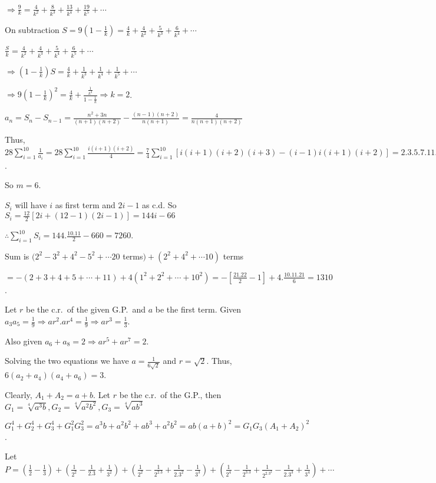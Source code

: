   $\Rightarrow \frac{9}{k} = \frac{4}{k^2} + \frac{8}{k^3} + \frac{13}{k^4} + \frac{19}{k^5} + \cdots$

  On subtraction $S = 9\left(1 - \frac{1}{k}\right) = \frac{4}{k} + \frac{4}{k^2} + \frac{5}{k^3}
  + \frac{6}{k^4} + \cdots$

  $\frac{S}{k} = \frac{4}{k^2} + \frac{4}{k^3} + \frac{5}{k^4} + \frac{6}{k^5} + \cdots$

  $\Rightarrow \left(1 - \frac{1}{k}\right)S = \frac{4}{k} + \frac{1}{k^3} + \frac{1}{k^4} + \frac{1}{k^5} +
  \cdots$

  $\Rightarrow 9\left(1 - \frac{1}{k}\right)^2 = \frac{4}{k} + \frac{\frac{1}{k^3}}{1
    - \frac{1}{k}}\Rightarrow k = 2$.
\item $a_n = S_n - S_{n - 1} = \frac{n^2 + 3n}{(n + 1)(n + 2)} - \frac{(n - 1)(n + 2)}{n(n + 1)}
  = \frac{4}{n(n + 1)(n + 2)}$

  Thus, $\displaystyle28\sum_{i = 1}^{10}\frac{1}{a_i} = 28\sum_{i = 1}^{10}\frac{i(i + 1)(i + 2)}{4}
  = \frac{7}{4}\sum_{i = 1}^{10}[i(i + 1)(i + 2)(i + 3) - (i - 1)i(i + 1)(i + 2)] = 2.3.5.7.11.13$.

  So $m = 6$.
\item $S_i$ will have $i$ as first term and $2i - 1$ as c.d. So $S_i = \frac{12}{2}[2i + (12 - 1)(2i - 1)] =
  144i - 66$

  $\therefore \displaystyle\sum_{i = 1}^{10}S_i = 144.\frac{10.11}{2} - 660 = 7260$.
\item Sum is $(2^2 - 3^2 + 4^2 - 5^2 + \cdots 20$ terms$) + (2^2 + 4^2 + \cdots 10)$ terms

  $= -(2 + 3 + 4 + 5 + \cdots + 11) + 4(1^2 + 2^2 + \cdots + 10^2) = -\left[\frac{21.22}{2} - 1\right] +
  4.\frac{10.11.21}{6} = 1310$.
\item Let $r$ be the c.r.\ of the given G.P.\ and $a$ be the first term. Given $a_3a_5
  = \frac{1}{9}\Rightarrow ar^2.ar^4 = \frac{1}{9}\Rightarrow ar^3 = \frac{1}{3}$.

  Also given $a_6 + a_8 = 2 \Rightarrow ar^5 + ar^7 = 2$.

  Solving the two equations we have $a = \frac{1}{6\sqrt{2}}$ and $r = \sqrt{2}$. Thus, $6(a_2 + a_4)(a_4 +
  a_6) = 3$.
\item Clearly, $A_1 + A_2 = a + b$. Let $r$ be the c.r.\ of the G.P., then $G_1 = \sqrt[4]{a^3b}, G_2
  = \sqrt[4]{a^2b^2}, G_3 = \sqrt[4]{ab^3}$

  $G_1^4 + G_2^4 + G_3^4 + G_1^2G_3^2 = a^3b + a^2b^2 + ab^3 + a^2b^2 = ab(a + b)^2 = G_1G_3(A_1 + A_2)^2$.
\item Let $P = \left(\frac{1}{2} - \frac{1}{3}\right) + \left(\frac{1}{2^2}
  - \frac{1}{2.3} + \frac{1}{3^2}\right) + \left(\frac{1}{2^2} - \frac{1}{2^2.3} + \frac{1}{2.3^2}
  - \frac{1}{3^3}\right) + \left(\frac{1}{2^4} - \frac{1}{2^3.3} + \frac{1}{2^2.3^2} - \frac{1}{2.3^3}
  + \frac{1}{3^4}\right) + \cdots$

